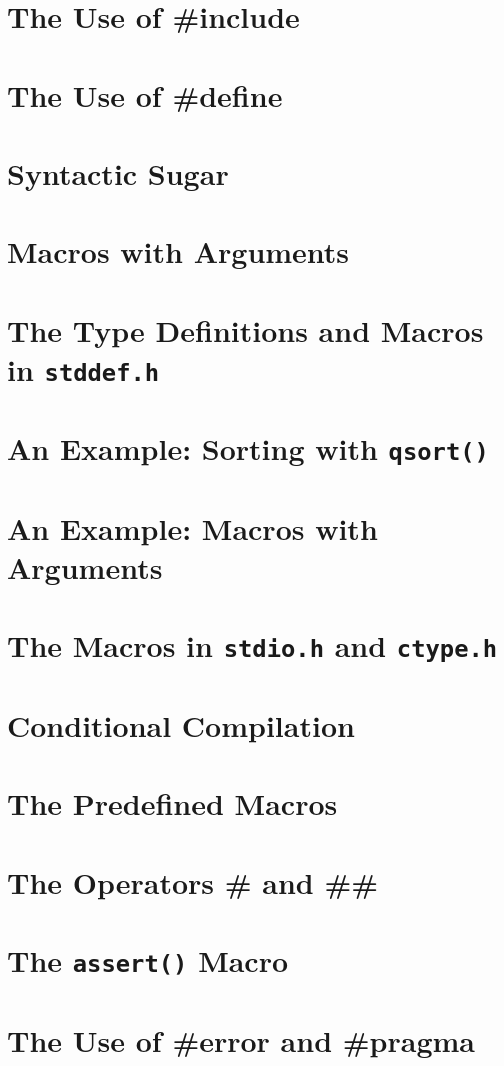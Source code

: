 \documentclass[12pt]{book}
\begin{document}
\section{The Use of \#include}
\section{The Use of \#define}
\section{Syntactic Sugar}
\section{Macros with Arguments}
\section{The Type Definitions and Macros in \texttt{stddef.h}}
\section{An Example: Sorting with \texttt{qsort()}}
\section{An Example: Macros with Arguments}
\section{The Macros in \texttt{stdio.h} and \texttt{ctype.h}}
\section{Conditional Compilation}
\section{The Predefined Macros}
\section{The Operators \# and \#\#}
\section{The \texttt{assert()} Macro}
\section{The Use of \#error and \#pragma}
\end{document}
